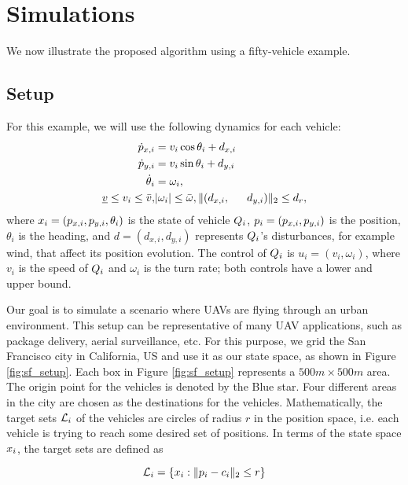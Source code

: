 \section{Simulations \label{sec:simulations}}
We now illustrate the proposed algorithm using a fifty-vehicle example. 

\subsection{Setup \label{sec:simSetup}}
For this example, we will use the following dynamics for each vehicle:
\begin{equation}
\label{eq:dyn_i}
\begin{aligned}
\dot{\pos}_{x,i} &= v_i \cos \theta_i + d_{x,i} \\
\dot{\pos}_{y,i} &= v_i \sin \theta_i + d_{y,i}\\
\dot{\theta}_i &= \omega_i, \\
\underline{v} \le v_i \le \bar{v}, & |\omega_i| \le \bar{\omega}, \|(d_{x,i}, & d_{y,i}) \|_2 \le d_{r},
\end{aligned}
\end{equation}
\noindent where $x_i = (p_{x,i}, p_{y,i}, \theta_i)$ is the state of vehicle $Q_i$, $p_i = (p_{x,i}, p_{y,i})$ is the position, $\theta_i$ is the heading, and $d = (d_{x,i}, d_{y,i})$ represents $Q_i$'s disturbances, for example wind, that affect its position evolution. The control of $Q_i$ is $u_i = (v_i, \omega_i)$, where $v_i$ is the speed of $Q_i$ and $\omega_i$ is the turn rate; both controls have a lower and upper bound. 

Our goal is to simulate a scenario where UAVs are flying through an urban environment. This setup can be representative of many UAV applications, such as package delivery, aerial surveillance, etc. For this purpose, we grid the San Francisco city in California, US and use it as our state space, as shown in Figure \ref{fig:sf_setup}. Each box in Figure \ref{fig:sf_setup} represents a $500m \times 500m$ area. The origin point for the vehicles is denoted by the Blue star. Four different areas in the city are chosen as the destinations for the vehicles. Mathematically, the target sets $\mathcal{L}_i$ of the vehicles are circles of radius $r$ in the position space, i.e. each vehicle is trying to reach some desired set of positions. In terms of the state space $x_i$, the target sets are defined as

\begin{equation}
\label{eq:target_sim}
\targetset_i = \{\state_i: \|\pos_i - c_i\|_2 \le r\}
\end{equation}

